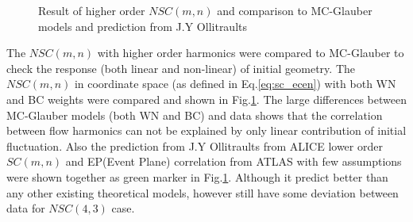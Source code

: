 \begin{figure}[h]
\begin{center}
        \caption{Result of  higher order $NSC(m,n)$ and comparison to MC-Glauber models and prediction from J.Y Ollitraults\cite{Giacalone:2016afq}  }
        \label{fig_sc_higher:glauber}
        \end{center}   
     \end{figure}

 The $NSC(m,n)$ with higher order harmonics were compared to MC-Glauber to check the response (both linear and non-linear) of initial geometry. The $NSC(m,n)$ in coordinate space (as defined in Eq.\ref{eq:sc_ecen}) with both WN and BC weights were compared and shown in Fig.\ref{fig_sc_higher:glauber}. The large differences between MC-Glauber models (both WN and BC) and data shows that the correlation between flow harmonics can not be explained by only linear contribution of initial fluctuation. Also the prediction from J.Y Ollitraults from ALICE lower order $SC(m,n)$ and EP(Event Plane) correlation from ATLAS with few assumptions\cite{Giacalone:2016afq} were shown together as green marker in Fig.\ref{fig_sc_higher:glauber}. Although it predict better than any other existing theoretical models, however still have some deviation between data for $NSC(4,3)$ case.
 

